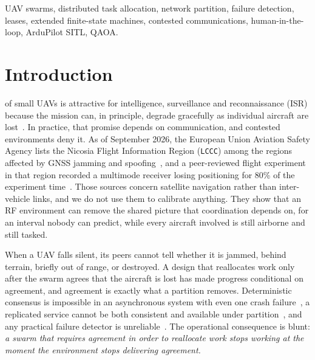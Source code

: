 \documentclass[conference]{IEEEtran}
\newcommand{\code}[1]{\texttt{#1}}    %
\begin{document}
\begin{IEEEkeywords}
UAV swarms, distributed task allocation, network partition, failure
detection, leases, extended finite-state machines, contested communications,
human-in-the-loop, ArduPilot SITL, QAOA.
\end{IEEEkeywords}

\section{Introduction}
\label{sec:intro}

 of small UAVs is attractive for intelligence,
surveillance and reconnaissance (ISR) because the mission can, in principle,
degrade gracefully as individual aircraft are
lost~\cite{brambilla2013swarm,chung2018survey}. In practice, that promise
depends on communication, and contested environments deny it. As of September
2026, the European Union Aviation Safety Agency lists the Nicosia Flight
Information Region (\code{LCCC}) among the
regions affected by GNSS jamming and spoofing~\cite{easa_gnss,easa_sib2022},
and a peer-reviewed flight experiment in that region recorded a multimode
receiver losing positioning for 80\% of the experiment time~\cite{osechas2022gnss}.
Those sources concern satellite navigation rather than inter-vehicle links,
and we do not use them to calibrate anything. They show that an RF
environment can remove the shared picture that coordination depends on, for
an interval nobody can predict, while every aircraft involved is still
airborne and still tasked.

When a UAV falls silent, its peers cannot tell whether it is jammed, behind
terrain, briefly out of range, or destroyed. A design that reallocates work
only after the swarm agrees that the aircraft is lost has made progress
conditional on agreement, and agreement is exactly what a partition removes.
Deterministic consensus is impossible in an asynchronous system with even one
crash failure~\cite{fischer1985impossibility}, a replicated service cannot be
both consistent and available under partition~\cite{gilbert2002cap}, and any
practical failure detector is unreliable~\cite{chandra1996unreliable}. The
operational consequence is blunt: \emph{a swarm that requires agreement in
order to reallocate work stops working at the moment the environment stops
delivering agreement.}
\end{document}
